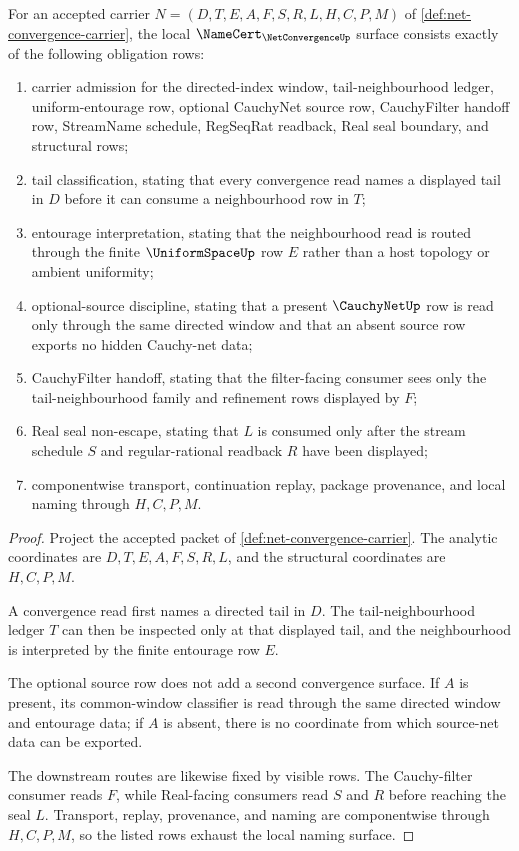 \begin{theorem}
\label{thm:net-convergence-namecert-obligations}
For an accepted carrier $N=(D,T,E,A,F,S,R,L,H,C,P,M)$ of \autoref{def:net-convergence-carrier}, the local $\NameCert_{\NetConvergenceUp}$ surface consists exactly of the following obligation rows:
\begin{enumerate}
\item carrier admission for the directed-index window, tail-neighbourhood ledger, uniform-entourage row, optional CauchyNet source row, CauchyFilter handoff row, StreamName schedule, RegSeqRat readback, Real seal boundary, and structural rows;
\item tail classification, stating that every convergence read names a displayed tail in $D$ before it can consume a neighbourhood row in $T$;
\item entourage interpretation, stating that the neighbourhood read is routed through the finite $\UniformSpaceUp$ row $E$ rather than a host topology or ambient uniformity;
\item optional-source discipline, stating that a present $\CauchyNetUp$ row is read only through the same directed window and that an absent source row exports no hidden Cauchy-net data;
\item CauchyFilter handoff, stating that the filter-facing consumer sees only the tail-neighbourhood family and refinement rows displayed by $F$;
\item Real seal non-escape, stating that $L$ is consumed only after the stream schedule $S$ and regular-rational readback $R$ have been displayed;
\item componentwise transport, continuation replay, package provenance, and local naming through $H,C,P,M$.
\end{enumerate}
\end{theorem}
\begin{proof}
Project the accepted packet of \autoref{def:net-convergence-carrier}. The analytic coordinates are $D,T,E,A,F,S,R,L$, and the structural coordinates are $H,C,P,M$.

A convergence read first names a directed tail in $D$. The tail-neighbourhood ledger $T$ can then be inspected only at that displayed tail, and the neighbourhood is interpreted by the finite entourage row $E$.

The optional source row does not add a second convergence surface. If $A$ is present, its common-window classifier is read through the same directed window and entourage data; if $A$ is absent, there is no coordinate from which source-net data can be exported.

The downstream routes are likewise fixed by visible rows. The Cauchy-filter consumer reads $F$, while Real-facing consumers read $S$ and $R$ before reaching the seal $L$. Transport, replay, provenance, and naming are componentwise through $H,C,P,M$, so the listed rows exhaust the local naming surface.
\end{proof}

